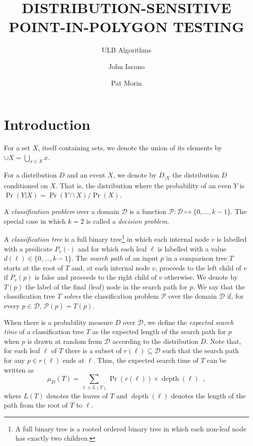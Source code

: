 \documentclass[charterfonts,lotsofwhite]{patmorin}
\title{\MakeUppercase{Distribution-Sensitive Point-in-Polygon Testing}}
\author{ULB Algorithms \and John Iacono \and Pat Morin}
\date{}
\DeclareMathOperator{\depth}{depth}
\begin{document}
\maketitle

\section{Introduction}


For a set $X$, itself containing sets, we denote the union of its
elements by $\cup X=\bigcup_{x\in X} x$.

For a distribution $D$ and an event $X$, we denote by $D_{|X}$ the
distribution $D$ conditioned on $X$.  That is, the distribution where 
the probability of an even $Y$ is
$\Pr(Y|X)=\Pr(Y\cap X)/\Pr(X)$.

A \emph{classification problem} over a domain $\mathcal{D}$ is a function
$\mathcal{P}:\mathcal{D}\mapsto \{0,\ldots,k-1\}$.  The special case
in which $k=2$ is called a \emph{decision problem}.

A \emph{classification tree} is a full binary tree\footnote{A full
binary tree is a rooted ordered binary tree in which each non-leaf
node has exactly two children.} in which each internal node $v$ is
labelled with a predicate $P_v(\cdot)$ and for which each leaf $\ell$
is labelled with a value $d(\ell)\in\{0,\ldots,k-1\}$. The
\emph{search path} of an input $p$ in a comparison tree $T$ starts at
the root of $T$ and, at each internal node $v$, proceeds to the left
child of $v$ if $P_v(p)$ is false and proceeds to the right child of
$v$ otherwise.  We denote by $T(p)$ the label of the final (leaf) node
in the search path for $p$.  We say that the classification tree $T$
\emph{solves} the classification problem $\mathcal{P}$ over the domain
$\mathcal{D}$ if, for every $p\in \mathcal{D}$, $\mathcal{P}(p)=T(p)$.

When there is a probability measure $D$ over $\mathcal{D}$, we define
the \emph{expected search time} of a classification tree $T$ as the
expected length of the search path for $p$ when $p$ is drawn at random
from $\mathcal{D}$ according to the distribution $D$.  Note that, for
each leaf $\ell$ of $T$ there is a subset of $r(\ell)\subseteq
\mathcal{D}$ such that the search path for any $p\in r(\ell)$ ends at
$\ell$.  Thus, the expected search time of $T$ can be written as
\[
     \mu_D(T) = \sum_{\ell\in L(T)} \Pr(r(\ell))\times \depth(\ell)
	\enspace ,
\]
where $L(T)$ denotes the leaves of $T$ and $\depth(\ell)$ denotes the
length of the path from the root of $T$ to $\ell$.
\end{document}
